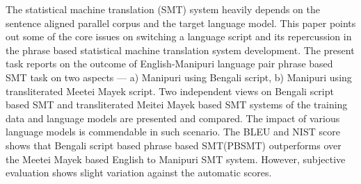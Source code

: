 The statistical machine translation (SMT) system heavily depends on the sentence aligned parallel corpus and the target language model. This paper
 points out some of the core issues on switching a language script and its
 repercussion in the phrase based statistical machine translation system
 development. The present
 task reports on the outcome of English-Manipuri language pair phrase based SMT
 task on two aspects --- a) Manipuri using Bengali script, b) Manipuri using
 transliterated Meetei Mayek script. Two independent views on Bengali script
 based SMT and transliterated Meitei Mayek based SMT systems of the training
 data and language models are presented and compared. The impact of various
 language models is commendable in such scenario. The BLEU and NIST score shows
 that Bengali script based phrase based SMT(PBSMT) outperforms over the Meetei
 Mayek based English to Manipuri SMT system. However, subjective evaluation
 shows slight
 variation against the automatic scores.

